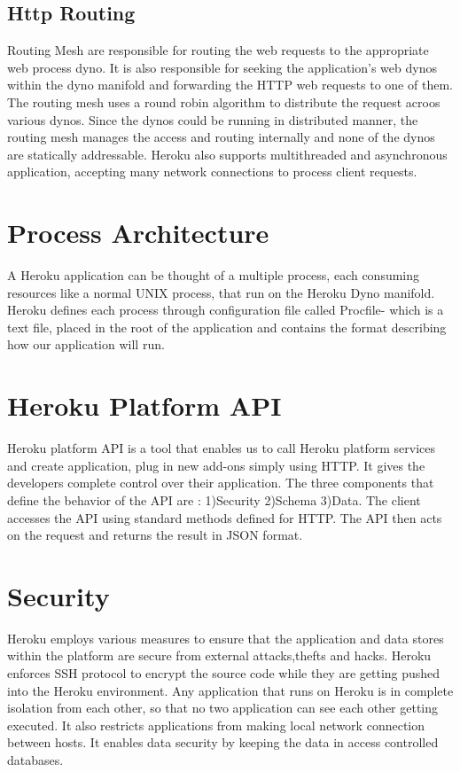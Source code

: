 \documentclass[9pt,twocolumn,twoside]{../../styles/osajnl}
\begin{document}
\subsection{Http Routing}
	Routing Mesh are responsible for routing the web requests to the appropriate
	web process dyno. It is also responsible for seeking the application’s web dynos
	within the dyno manifold and forwarding the HTTP web requests to one of them.
	The routing mesh uses a round robin algorithm to distribute the request acroos
	various dynos. Since the dynos could be running in distributed manner, the
	routing mesh manages the access and routing internally and none of the dynos are
	statically addressable. Heroku also supports multithreaded and asynchronous
	application, accepting many network connections to process client requests.


\section{Process Architecture}
	A Heroku application can be thought of a multiple process, each consuming
	resources like a normal UNIX process, that run on the Heroku Dyno manifold.
	Heroku defines each process through configuration file called Procfile- which is
	a text file, placed in the root of the application and contains the format
	describing 	how our application will run.

\section{Heroku Platform API}
	Heroku platform API is a tool that enables us to call Heroku platform services
	and create application, plug in new add-ons simply using HTTP. It gives the
	developers complete control over their application. The three components that
	define the behavior of the API are : 1)Security 2)Schema 3)Data. The client
	accesses the API using standard methods defined for HTTP. The API then acts on
	the request and returns the result in JSON format.

\section{Security}
	Heroku employs various measures to ensure that the application and data stores
	within the platform are secure from external attacks,thefts and hacks. Heroku
	enforces SSH\cite{SSH} protocol to encrypt the source code while they are
	getting pushed into the Heroku environment. Any application that runs on Heroku
	is in complete isolation from each other, so that no two application can see
	each other getting executed. It also restricts applications from making local
	network connection between hosts. It enables data security by keeping the data
	in access controlled databases.
\end{document}
